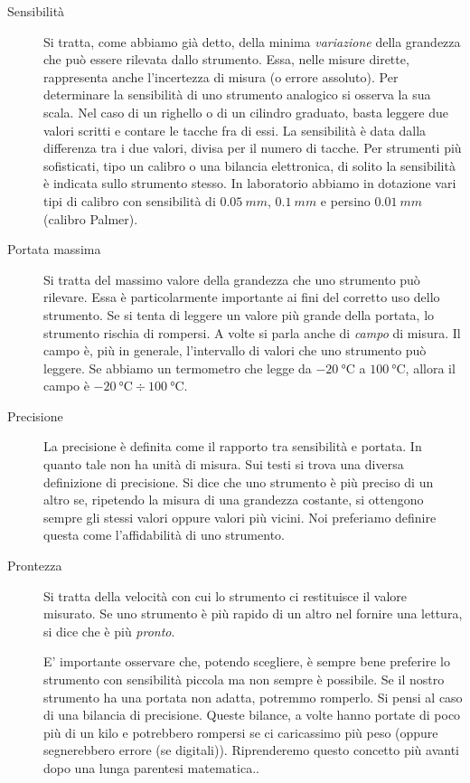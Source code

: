 \begin{description}
\item[Sensibilità] Si tratta, come abbiamo già detto, della minima \textit{variazione} della grandezza che può essere rilevata dallo strumento. Essa, nelle misure dirette, rappresenta anche l'incertezza di misura (o errore assoluto). Per determinare la sensibilità di uno strumento analogico si osserva la sua scala. Nel caso di un righello o di un cilindro graduato, basta leggere due valori scritti e contare le tacche fra di essi. La sensibilità è data dalla differenza tra i due valori, divisa per il numero di tacche. Per strumenti più sofisticati, tipo un calibro o una bilancia elettronica, di solito la sensibilità è indicata sullo strumento stesso. In laboratorio abbiamo in dotazione vari tipi di calibro con sensibilità di $\SI{0,05}{mm}$, $\SI{0,1}{mm}$ e persino $\SI{0,01}{mm}$ (calibro Palmer).
\item[Portata massima] Si tratta del massimo valore della grandezza che uno strumento può rilevare. Essa è particolarmente importante ai fini del corretto uso dello strumento. Se si tenta di leggere un valore più grande della portata, lo strumento rischia di rompersi. A volte si parla anche di \textit{campo} di misura. Il campo è, più in generale, l'intervallo di valori che uno strumento può leggere. Se abbiamo un termometro che legge da $\SI{-20}{\celsius}$ a $\SI{100}{\celsius}$, allora il campo è $\SI{-20}{\celsius}\div\SI{100}{\celsius}$. 


\item[Precisione] La precisione è definita come il rapporto tra sensibilità e portata. In quanto tale non ha unità di misura. Sui testi si trova una diversa definizione di precisione. Si dice che uno strumento è più preciso di un altro se, ripetendo la misura di una grandezza costante, si ottengono sempre gli stessi valori oppure valori più vicini. Noi preferiamo definire questa come l'affidabilità di uno strumento.
\item[Prontezza] Si tratta della velocità con cui lo strumento ci restituisce il valore misurato. Se uno strumento è più rapido di un altro nel fornire una lettura, si dice che è più \textit{pronto}.

E' importante osservare che, potendo scegliere, è sempre bene preferire lo strumento con sensibilità piccola ma non sempre è possibile. Se il nostro strumento ha una portata non adatta, potremmo romperlo. Si pensi al caso di una bilancia di precisione. Queste bilance, a volte hanno portate di poco più di un kilo e potrebbero rompersi se ci caricassimo più peso (oppure segnerebbero errore (se digitali)). Riprenderemo questo concetto più avanti dopo una lunga parentesi matematica..
\end{description}


